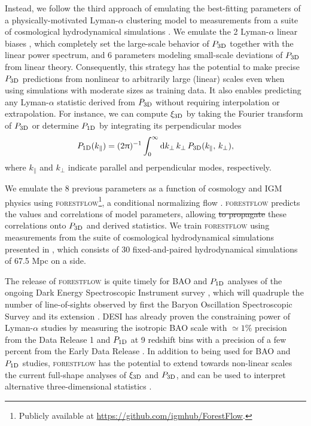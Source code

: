 \documentclass{aa}
\newcommand{\lya}{Lyman-$\alpha$\xspace}
\newcommand{\poned}{\ensuremath{P_{\rm 1D}}\xspace}
\newcommand{\xithreed}{\ensuremath{\xi_{\rm 3D}}\xspace}
\newcommand{\pthreed}{\ensuremath{P_{\rm 3D}}\xspace}
\newcommand{\forestflow}{\textsc{forestflow}\xspace}
\providecommand{\DIFaddtex}[1]{{\protect\color{blue}\uwave{#1}}} %
\providecommand{\DIFdeltex}[1]{{\protect\color{red}\sout{#1}}}                      %
\providecommand{\DIFaddbegin}{} %
\providecommand{\DIFaddend}{} %
\providecommand{\DIFdelbegin}{} %
\providecommand{\DIFdelend}{} %
\providecommand{\DIFadd}[1]{\texorpdfstring{\DIFaddtex{#1}}{#1}} %
\providecommand{\DIFdel}[1]{\texorpdfstring{\DIFdeltex{#1}}{}} %
\newcommand{\DIFscaledelfig}{0.5}
\newlength{\DIFdelgraphicswidth} %
\newlength{\DIFdelgraphicsheight} %
\newcommand{\DIFaddincludegraphics}[2][]{{\color{blue}\fbox{\DIFOincludegraphics[#1]{#2}}}} %
\newcommand{\DIFdelincludegraphics}[2][]{%
\sbox{\DIFdelgraphicsbox}{\DIFOincludegraphics[#1]{#2}}%
\settoboxwidth{\DIFdelgraphicswidth}{\DIFdelgraphicsbox} %
\settoboxtotalheight{\DIFdelgraphicsheight}{\DIFdelgraphicsbox} %
\scalebox{\DIFscaledelfig}{%
\parbox[b]{\DIFdelgraphicswidth}{\usebox{\DIFdelgraphicsbox}\\[-\baselineskip] \rule{\DIFdelgraphicswidth}{0em}}\llap{\resizebox{\DIFdelgraphicswidth}{\DIFdelgraphicsheight}{%
\setlength{\unitlength}{\DIFdelgraphicswidth}%
\begin{picture}(1,1)%
\thicklines\linethickness{2pt} %
{\color[rgb]{1,0,0}\put(0,0){\framebox(1,1){}}}%
{\color[rgb]{1,0,0}\put(0,0){\line( 1,1){1}}}%
{\color[rgb]{1,0,0}\put(0,1){\line(1,-1){1}}}%
\end{picture}%
}\hspace*{3pt}}} %
} %
\DeclareRobustCommand{\DIFaddbegin}{\DIFOaddbegin \let\includegraphics\DIFaddincludegraphics} %
\DeclareRobustCommand{\DIFaddend}{\DIFOaddend \let\includegraphics\DIFOincludegraphics} %
\DeclareRobustCommand{\DIFdelbegin}{\DIFOdelbegin \let\includegraphics\DIFdelincludegraphics} %
\DeclareRobustCommand{\DIFdelend}{\DIFOaddend \let\includegraphics\DIFOincludegraphics} %
\begin{document}
Instead, we follow the third approach of emulating the best-fitting parameters of a physically-motivated \lya clustering model to measurements from a suite of cosmological hydrodynamical simulations \citep[see][]{mcdonald2003MeasurementCosmologicalGeometry, arinyo-i-prats2015NonlinearPowerSpectrum}. We emulate the 2 \lya linear biases \DIFaddbegin \DIFadd{($b_\delta$ and $b_\eta$)}\DIFaddend , which completely set the large-scale behavior of \pthreed together with the linear power spectrum, and 6 parameters modeling small-scale deviations of \pthreed from linear theory. Consequently, this strategy has the potential to make precise \pthreed predictions from nonlinear to arbitrarily large (linear) scales even when using simulations with moderate sizes as training data. It also enables predicting any \lya statistic derived from \pthreed without requiring interpolation or extrapolation. For instance, we can compute \xithreed by taking the Fourier transform of \pthreed or determine \poned by integrating its perpendicular modes
%
\begin{equation}
    \label{eq:p1d}
    \poned(k_\parallel)=(2\uppi)^{-1}\int_0^\infty \mathrm{d} k_\perp\, k_\perp\, \pthreed(k_\parallel,\, k_\perp),
\end{equation}
%
where $k_\parallel$ and $k_\perp$ indicate parallel and perpendicular modes, respectively.

We emulate the 8 previous parameters as a function of cosmology and IGM physics using \forestflow\footnote{Publicly available at \url{https://github.com/igmhub/ForestFlow}.}, a conditional normalizing flow \citep[cNFs;][]{Winkler2019, cNF_Papamakarios}. \forestflow predicts the values and correlations of model parameters, allowing \DIFdelbegin \DIFdel{to propagate }\DIFdelend \DIFaddbegin \DIFadd{the propagation of }\DIFaddend these correlations onto \pthreed and derived statistics. We train \forestflow using measurements from the suite of cosmological hydrodynamical simulations presented in \citet{Pedersen2021}, which consists of 30 fixed-and-paired hydrodynamical simulations of 67.5 Mpc on a side.

The release of \forestflow is quite timely for BAO and \poned analyses of the ongoing Dark Energy Spectroscopic Instrument survey \citep[DESI;][]{DESI_collab2016}, which will quadruple the number of line-of-sights observed by first the Baryon Oscillation Spectroscopic Survey \citep[BOSS;][]{boss_dawson2013} and its extension \citep[eBOSS;][]{eboss_dawson2016}. DESI has already proven the constraining power of \lya studies by measuring the isotropic BAO scale with $\simeq1\%$ precision from the Data Release 1 \citep{desicollaboration2024DESI2024IV} and \poned at 9 redshift bins with a precision of a few percent from the Early Data Release \citep{ravoux2023DarkEnergySpectroscopica, karacayli2024Optimal1DLy}. In addition to being used for BAO and \poned studies, \forestflow has the potential to extend towards non-linear scales the current full-shape analyses of \xithreed \citep{cuceu2023ConstraintsCosmicExpansion, 2023MNRAS.518.2567G} and \pthreed \citep{fontribera2018HowEstimate3D, Belsunce2024eBOSS, Horowitz2024}, and can be used to interpret alternative three-dimensional statistics \citep{hui1999GeometricalTestCosmological, fontribera2018HowEstimate3D, Karim2023}.
\end{document}
